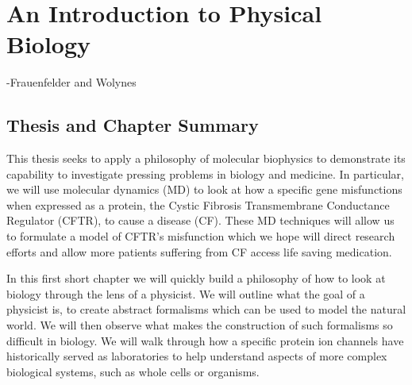 \chapter{An Introduction to Physical Biology}
\setcounter{page}{1}
\label{chap:introduction}
 {-Frauenfelder and Wolynes \cite{frauenfelder1994}}
\vspace
\section{Thesis and Chapter Summary}

This thesis seeks to apply a philosophy of molecular biophysics to demonstrate its capability to investigate pressing problems in biology and medicine. In particular, we will use molecular dynamics (MD) to look at how a specific gene misfunctions when expressed as a protein, the Cystic Fibrosis Transmembrane Conductance Regulator (CFTR), to cause a disease (CF). These MD techniques will allow us to formulate a model of CFTR's misfunction which we hope will direct research efforts and allow more patients suffering from CF access life saving medication. 

In this first short chapter we will quickly build a philosophy of how to look at biology through the lens of a physicist. We will outline what the goal of a physicist is, to create abstract formalisms which can be used to model the natural world. We will then observe what makes the construction of such formalisms so difficult in biology. We will walk through how a specific protein ion channels have historically served as laboratories to help understand aspects of more complex biological systems, such as whole cells or organisms. 

